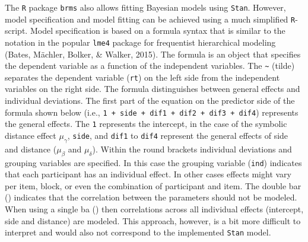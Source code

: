 \documentclass[
  english,
  doc,floatsintext]{apa6}
\begin{document}
The \texttt{R} package \texttt{brms} also allows fitting Bayesian models using \texttt{Stan}. However, model specification and model fitting can be achieved using a much simplified \texttt{R}-script. Model specification is based on a formula syntax that is similar to the notation in the popular \texttt{lme4} package for frequentist hierarchical modeling (Bates, Mächler, Bolker, \& Walker, 2015). The formula is an object that specifies the dependent variable as a function of the independent variables. The \texttt{\textasciitilde{}} (tilde) separates the dependent variable (\texttt{rt}) on the left side from the independent variables on the right side. The formula distinguishes between general effects and individual deviations. The first part of the equation on the predictor side of the formula shown below (i.e., \texttt{1\ +\ side\ +\ dif1\ +\ dif2\ +\ dif3\ +\ dif4}) represents the general effects. The \texttt{1} represents the intercept, in the case of the symbolic distance effect \(\mu_{\gamma}\), \texttt{side}, and \texttt{dif1} to \texttt{dif4} represent the general effects of side and distance (\(\mu_{\beta}\) and \(\mu_{\delta}\)). Within the round brackets individual deviations and grouping variables are specified. In this case the grouping variable (\texttt{ind}) indicates that each participant has an individual effect. In other cases effects might vary per item, block, or even the combination of participant and item. The double bar (\texttt{\textbar{}\textbar{}}) indicates that the correlation between the parameters should not be modeled. When using a single ba (\texttt{\textbar{}}) then correlations across all individual effects (intercept, side and distance) are modeled. This approach, however, is a bit more difficult to interpret and would also not correspond to the implemented \texttt{Stan} model.

\scriptsize
\end{document}
